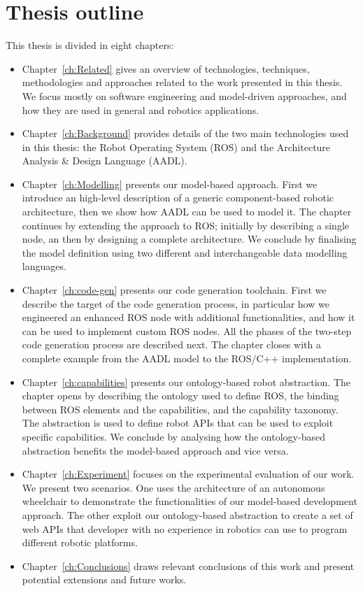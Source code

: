 \section{Thesis outline}
This thesis is divided in eight chapters:
\begin{itemize}
\item Chapter~\ref{ch:Related} gives an overview of technologies, techniques, methodologies and approaches related to the work presented in this thesis.  We focus mostly on software engineering and model-driven approaches, and how they are used in general and robotics applications.
\item Chapter~\ref{ch:Background} provides details of the two main technologies used in this thesis: the Robot Operating System (ROS) and the Architecture Analysis \& Design Language (AADL).
\item Chapter~\ref{ch:Modelling} presents our model-based approach. First we introduce an high-level description of a generic component-based robotic architecture, then we show how AADL can be used to model it. The chapter continues by extending the approach to ROS; initially by describing a single node, an then by designing a complete architecture. We conclude by finalising the model definition using two different and interchangeable data modelling languages.
\item Chapter~\ref{ch:code-gen} presents our code generation toolchain. First we describe the target of the code generation process, in particular how we engineered an enhanced ROS node with additional functionalities, and how it can be used to implement custom ROS nodes. All the phases of the two-step code generation process are described next. The chapter closes with a complete example from the AADL model to the ROS/C++ implementation.
\item Chapter~\ref{ch:capabilities} presents our ontology-based robot abstraction. The chapter opens by describing the ontology used to define ROS, the binding between ROS elements and the capabilities, and the capability taxonomy. The abstraction is used to define robot APIs that can be used to exploit specific capabilities. We conclude by analysing how the ontology-based abstraction benefits the model-based approach and vice versa.
\item Chapter~\ref{ch:Experiment} focuses on the experimental evaluation of our work. We present two scenarios. One uses the architecture of an autonomous wheelchair to demonstrate the functionalities of our model-based development approach. The other exploit our ontology-based abstraction to create a set of web APIs that developer with no experience in robotics can use to program different robotic platforms.
\item Chapter~\ref{ch:Conclusions} draws relevant conclusions of this work and present potential extensions and future works.
\end{itemize}

